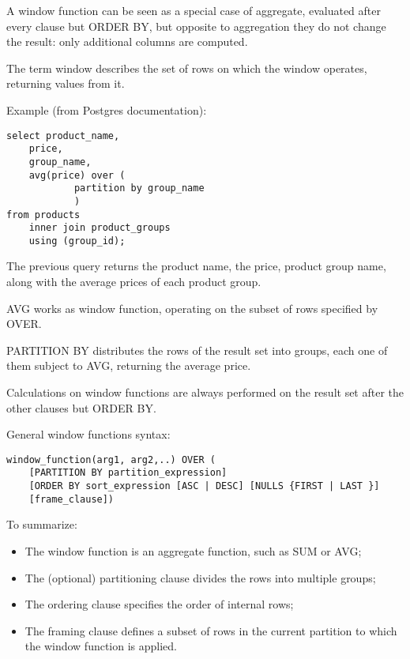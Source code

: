 A window function can be seen as a special case of aggregate, evaluated after every clause but ORDER BY, but opposite to aggregation they do not change the result: only additional columns are computed.

The term window describes the set of rows on which the window operates, returning values from it. 

Example (from Postgres documentation):
\begin{lstlisting}
select product_name, 
	price, 
	group_name, 
	avg(price) over (
			partition by group_name
			)
from products
	inner join product_groups
	using (group_id);
\end{lstlisting}
The previous query returns the product name, the price, product group name, along with the average prices of each product group.

AVG works as window function, operating on the subset of rows specified by OVER. 

PARTITION BY distributes the rows of the result set into groups, each one of them subject to AVG, returning the average price.

Calculations on window functions are always performed on the result set after the other clauses but ORDER BY.

General window functions syntax:
\begin{lstlisting}
window_function(arg1, arg2,..) OVER (
	[PARTITION BY partition_expression]
	[ORDER BY sort_expression [ASC | DESC] [NULLS {FIRST | LAST }]
	[frame_clause])
\end{lstlisting}

To summarize:
\begin{itemize}
	\item The window function is an aggregate function, such as SUM or AVG;
	\item The (optional) partitioning clause divides the rows into multiple groups;
	\item The ordering clause specifies the order of internal rows;
	\item The framing clause defines a subset of rows in the current partition to which the window function is applied.
\end{itemize}

